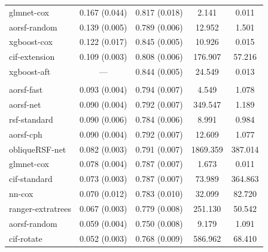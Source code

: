 \documentclass{article}\usepackage[]{graphicx}\usepackage[]{xcolor}
\newenvironment{knitrout}{}{} %
\begin{document}
\begin{knitrout}
\begin{longtable}[t]{lcccc}
\hspace{1em}glmnet-cox & 0.167 (0.044) & 0.817 (0.018) & 2.141 & 0.011\\
\hspace{1em}aorsf-random & 0.139 (0.005) & 0.789 (0.006) & 12.952 & 1.501\\
\hspace{1em}xgboost-cox & 0.122 (0.017) & 0.845 (0.005) & 10.926 & 0.015\\
\hspace{1em}cif-extension & 0.109 (0.003) & 0.808 (0.006) & 176.907 & 57.216\\
\hspace{1em}xgboost-aft & --- & 0.844 (0.005) & 24.549 & 0.013\\
\addlinespace[0.3em]
\multicolumn{5}{l}{\textit{\textbf{ARIC; stroke, n = 13623, p = 41}}}\\
\hline
\hspace{1em}aorsf-fast & 0.093 (0.004) & 0.794 (0.007) & 4.549 & 1.078\\
\hspace{1em}aorsf-net & 0.090 (0.004) & 0.792 (0.007) & 349.547 & 1.189\\
\hspace{1em}rsf-standard & 0.090 (0.006) & 0.784 (0.006) & 8.991 & 0.984\\
\hspace{1em}aorsf-cph & 0.090 (0.004) & 0.792 (0.007) & 12.609 & 1.077\\
\hspace{1em}obliqueRSF-net & 0.082 (0.003) & 0.791 (0.007) & 1869.359 & 387.014\\
\hspace{1em}glmnet-cox & 0.078 (0.004) & 0.787 (0.007) & 1.673 & 0.011\\
\hspace{1em}cif-standard & 0.073 (0.003) & 0.787 (0.007) & 73.989 & 364.863\\
\hspace{1em}nn-cox & 0.070 (0.012) & 0.783 (0.010) & 32.099 & 82.720\\
\hspace{1em}ranger-extratrees & 0.067 (0.003) & 0.779 (0.008) & 251.130 & 50.542\\
\hspace{1em}aorsf-random & 0.059 (0.004) & 0.750 (0.008) & 9.179 & 1.091\\
\hspace{1em}cif-rotate & 0.052 (0.003) & 0.768 (0.009) & 586.962 & 68.410\\

\end{longtable}
\end{knitrout}
\end{document}
